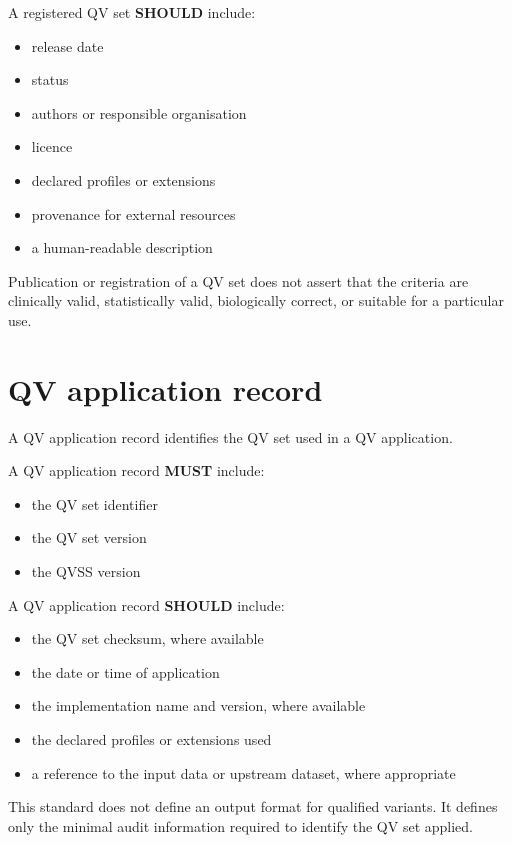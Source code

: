 \documentclass[11pt,a4paper]{article}
\begin{document}
A registered QV set \textbf{SHOULD} include:

\begin{itemize}
\item release date
\item status
\item authors or responsible organisation
\item licence
\item declared profiles or extensions
\item provenance for external resources
\item a human-readable description
\end{itemize}

Publication or registration of a QV set does not assert that the criteria are clinically valid, statistically valid, biologically correct, or suitable for a particular use.

\section{QV application record}

A QV application record identifies the QV set used in a QV application.

A QV application record \textbf{MUST} include:

\begin{itemize}
\item the QV set identifier
\item the QV set version
\item the QVSS version
\end{itemize}

A QV application record \textbf{SHOULD} include:

\begin{itemize}
\item the QV set checksum, where available
\item the date or time of application
\item the implementation name and version, where available
\item the declared profiles or extensions used
\item a reference to the input data or upstream dataset, where appropriate
\end{itemize}

This standard does not define an output format for qualified variants. It defines only the minimal audit information required to identify the QV set applied.
\end{document}
